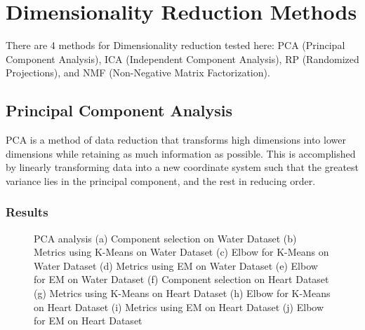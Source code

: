\documentclass[
	letterpaper, %
]{mlreport}
\begin{document}
\section{Dimensionality Reduction Methods}
There are 4 methods for Dimensionality reduction tested here: PCA (Principal Component Analysis), ICA (Independent Component Analysis), RP (Randomized Projections), and NMF (Non-Negative Matrix Factorization).

\subsection{Principal Component Analysis}
PCA is a method of data reduction that transforms high dimensions into lower dimensions while retaining as much information as possible. This is accomplished by linearly transforming data into a new coordinate system such that the greatest variance lies in the principal component, and the rest in reducing order.

\subsubsection{Results}
\begin{figure}
	\centering
	\caption{PCA analysis (a) Component selection on Water Dataset (b) Metrics using K-Means on Water Dataset (c) Elbow for K-Means on Water Dataset (d) Metrics using EM on Water Dataset (e) Elbow for EM on Water Dataset (f) Component selection on Heart Dataset (g) Metrics using K-Means on Heart Dataset (h) Elbow for K-Means on Heart Dataset (i) Metrics using EM on Heart Dataset (j) Elbow for EM on Heart Dataset}
	\label{fig:fig3}
\end{figure}
\end{document}
